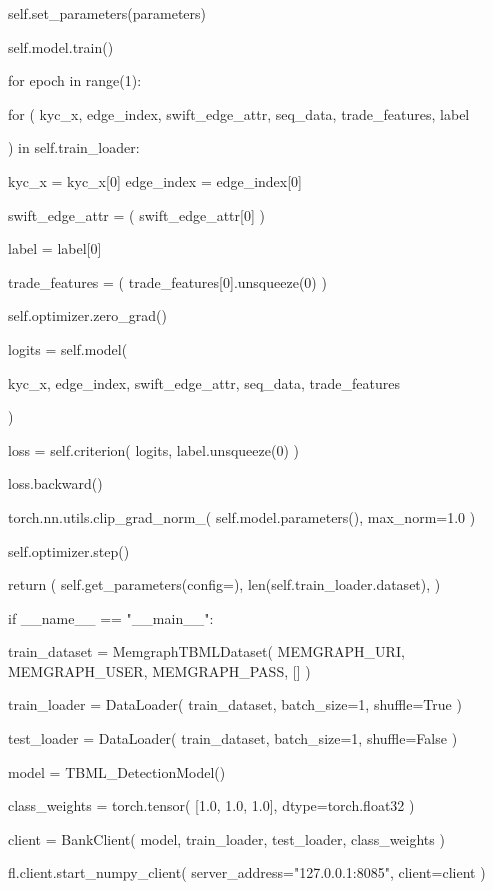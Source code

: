 \begin{tcblisting}
        self.set_parameters(parameters)

        self.model.train()

        for epoch in range(1):

            for (
                kyc_x,
                edge_index,
                swift_edge_attr,
                seq_data,
                trade_features,
                label

            ) in self.train_loader:

                kyc_x = kyc_x[0]
                edge_index = edge_index[0]

                swift_edge_attr = (
                    swift_edge_attr[0]
                )

                label = label[0]

                trade_features = (
                    trade_features[0].unsqueeze(0)
                )

                self.optimizer.zero_grad()

                logits = self.model(

                    kyc_x,
                    edge_index,
                    swift_edge_attr,
                    seq_data,
                    trade_features

                )

                loss = self.criterion(
                    logits,
                    label.unsqueeze(0)
                )

                loss.backward()

                torch.nn.utils.clip_grad_norm_(
                    self.model.parameters(),
                    max_norm=1.0
                )

                self.optimizer.step()

        return (
            self.get_parameters(config={}),
            len(self.train_loader.dataset),
            {}
        )

if __name__ == "__main__":

    train_dataset = MemgraphTBMLDataset(
        MEMGRAPH_URI,
        MEMGRAPH_USER,
        MEMGRAPH_PASS,
        []
    )

    train_loader = DataLoader(
        train_dataset,
        batch_size=1,
        shuffle=True
    )

    test_loader = DataLoader(
        train_dataset,
        batch_size=1,
        shuffle=False
    )

    model = TBML_DetectionModel()

    class_weights = torch.tensor(
        [1.0, 1.0, 1.0],
        dtype=torch.float32
    )

    client = BankClient(
        model,
        train_loader,
        test_loader,
        class_weights
    )

    fl.client.start_numpy_client(
        server_address="127.0.0.1:8085",
        client=client
    )

\end{tcblisting}



